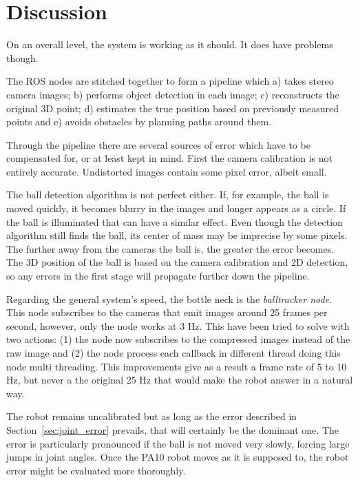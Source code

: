 \chapter{Discussion}
\label{chap:discussion}
On an overall level, the system is working as it should. It does have problems though.

The ROS nodes are stitched together to form a pipeline which a) takes stereo camera images; b) performs object detection in each image; c) reconstructs the original 3D point; d) estimates the true position based on previously measured points and e) avoids obstacles by planning paths around them.

Through the pipeline there are several sources of error which have to be compensated for, or at least kept in mind.
First the camera calibration is not entirely accurate.
Undistorted images contain some pixel error, albeit small.

The ball detection algorithm is not perfect either.
If, for example, the ball is moved quickly, it becomes blurry in the images and longer appears as a circle.
If the ball is illuminated that can have a similar effect.
Even though the detection algorithm still finds the ball, its center of mass may be imprecise by some pixels.
The further away from the cameras the ball is, the greater the error becomes.
The 3D position of the ball is based on the camera calibration and 2D detection, so any errors in the first stage will propagate further down the pipeline.

Regarding the general system's speed, the bottle neck is the \emph{balltracker node}. 
This node subscribes to the cameras that emit images around 25 frames per second, however, only the node works at 3 Hz. 
This have been tried to solve with two actions: (1) the node now subscribes to the compressed images instead of the raw image and (2) the node process each callback in different thread doing this node multi threading. 
This improvements give as a result a frame rate of 5 to 10 Hz, but never a the original 25 Hz that would make the robot answer in a natural way.
 
The robot remains uncalibrated but as long as the error described in Section~\ref{sec:joint_error} prevails, that will certainly be the dominant one. The error is particularly pronounced if the ball is not moved very slowly, forcing large jumps in joint angles. Once the PA10 robot moves as it is supposed to, the robot error might be evaluated more thoroughly.


